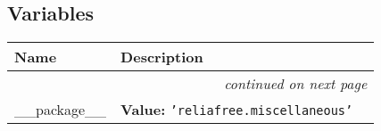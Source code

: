   \subsection{Variables}

    \vspace{-1cm}
\hspace{\varindent}\begin{longtable}{|p{\varnamewidth}|p{\vardescrwidth}|l}
\cline{1-2}
\cline{1-2} \centering \textbf{Name} & \centering \textbf{Description}& \\
\cline{1-2}
\endhead\cline{1-2}\multicolumn{3}{r}{\small\textit{continued on next page}}\\\endfoot\cline{1-2}
\endlastfoot\raggedright \_\-\_\-p\-a\-c\-k\-a\-g\-e\-\_\-\_\- & \raggedright \textbf{Value:} 
{\tt \texttt{'}\texttt{reliafree.miscellaneous}\texttt{'}}&\\
\cline{1-2}
\end{longtable}

